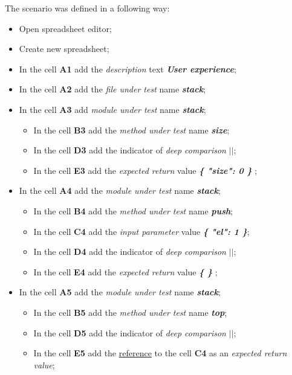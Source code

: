 The scenario was defined in a following way:
\begin{itemize}
	\item Open spreadsheet editor;
	\item Create new spreadsheet;
	\item In the cell \textbf{A1} add the \textit{description} text\textit{ \textbf{User experience}};
	\item In the cell \textbf{A2} add the \textit{file under test} name \textit{\textbf{stack}};
	\item In the cell \textbf{A3} add  \textit{module under test} name \textit{\textbf{stack}};
	\begin{itemize}
		\item In the cell \textbf{B3} add the \textit{method under test} name \textit{\textbf{size}};
		\item In the cell \textbf{D3} add the indicator of \textit{deep comparison}\textit{ \textbf{$||$}};
		\item In the cell \textbf{E3} add the \textit{expected return} value \textit{\textbf{ \{ "size": 0 \} }};
	\end{itemize}
	\item In the cell \textbf{A4} add the \textit{module under test} name\textit{ \textbf{stack}};
	\begin{itemize}
		\item In the cell \textbf{B4} add the \textit{method under test} name  \textit{\textbf{push}};
		\item In the cell \textbf{C4} add the \textit{input parameter} value \textit{\textbf{ \{ "el": 1 \}}};
		\item In the cell \textbf{D4} add the indicator of \textit{deep comparison}\textit{ \textbf{$||$}};
		\item In the cell \textbf{E4} add the \textit{expected return} value\textit{ \textbf{ \{ \} }};
	\end{itemize}
	\item In the cell \textbf{A5} add the  \textit{module under test} name \textit{ \textbf{stack}};
	\begin{itemize}
		\item In the cell \textbf{B5} add the \textit{method under test} name \textit{\textbf{top}};
		\item In the cell \textbf{D5} add the indicator of \textit{deep comparison}\textit{ \textbf{$||$}};
		\item In the cell \textbf{E5} add the \underline{reference} to the cell \textbf{C4} as an \textit{expected return value};

\end{itemize}
\end{itemize}
